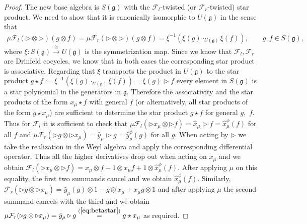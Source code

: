 \documentclass[pdftex]{sigma}
\def\gg{\mathfrak{g}}
\numberwithin{equation}{section}
\begin{document}
\begin{proof}
The new base algebra is $S(\gg)$ with the $\mathcal{F}_l$-twisted (or $\mathcal{F}_r$-twisted) star product. We need to show that it is canonically isomorphic to $U(\gg)$ in the sense that
\begin{gather*}
\mu \mathcal{F}_l(\triangleright\otimes\triangleright)(g\otimes f) =\mu \mathcal{F}_r(\triangleright\otimes\triangleright)(g\otimes f)
= \xi^{-1}(\xi(g)\cdot_{U(\gg)}\xi(f)),\qquad g,f\in S(\gg),
\end{gather*}
where $\xi\colon S(\gg)\stackrel\cong\to U(\gg)$ is the symmetrization map. Since we know that $\mathcal{F}_l,\mathcal{F}_r$ are Drinfeld cocycles, we know that in both cases the corresponding star product is associative. Regarding that $\xi$ transports the product in $U(\gg)$ to the star product $g\star f := \xi^{-1}(\xi(g)\cdot_{U(\gg)}\xi(f)) = \xi(g)\triangleright f$ every element in $S(\gg)$ is a star polynomial in the generators in $\gg$. Therefore the associativity and the star products of the form $x_\mu\star f$ with general $f$ (or
alternatively, all star products of the form $g\star x_\mu$) are sufficient to determine the star product $g\star f$ for general $g$,~$f$. Thus for $\mathcal{F}_l$ it is sufficient to check that $\mu \mathcal{F}_l(\triangleright x_\mu\otimes \triangleright f) = \hat{x}_\mu\triangleright f = \hat{x}_\mu^\phi(f)$ for all $f$ and $\mu \mathcal{F}_r(\triangleright g\otimes \triangleright x_\mu) = \hat{y}_\mu\triangleright g = \hat{y}^\phi_\mu(g)$ for all $g$. When acting by $\triangleright$ we take the realization in the Weyl algebra and apply the corresponding differential operator. Thus all the higher derivatives drop out when acting on $x_\mu$ and we obtain $\mathcal{F}_l(\triangleright x_\mu\otimes \triangleright f) = x_\mu\otimes f - 1\otimes x_\mu f + 1\otimes\hat{x}^\phi_\mu(f)$. After applying $\mu$ on this equality, the first two summands cancel and we obtain $\hat{x}^\phi_\mu(f)$. Similarly, $\mathcal{F}_r(\triangleright g\otimes \triangleright x_\mu)= \hat{y}_\mu(g)\otimes 1 - g\otimes x_\mu + x_\mu g\otimes 1$ and after applying $\mu$ the second summand cancels with the third and we obtain $\mu\mathcal{F}_r(\triangleright g\otimes \triangleright x_\mu) =\hat{y}_\mu\triangleright g \stackrel{(\ref{eq:betastar})}= g\star x_\mu$ as required.


\end{proof}
\end{document}
